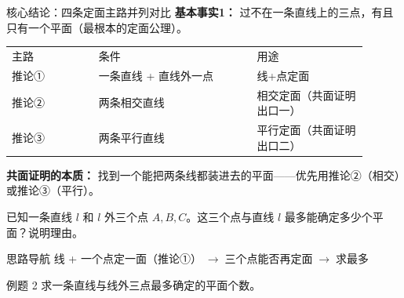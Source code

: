 \documentclass{exam-zh}
\begin{document}
\clearpage
{}


\begin{eduSolutionBox}{核心结论：四条定面主路并列对比}
  \begingroup
  \setlength{\parskip}{2.5mm}
\textbf{基本事实1：} 过不在一条直线上的三点，有且只有一个平面（最根本的定面公理）。\par
\begin{tabular}{p{0.22\linewidth}p{0.40\linewidth}p{0.28\linewidth}}
主路 & 条件 & 用途\\
推论① & 一条直线 + 直线外一点 & 线+点定面\\
推论② & 两条相交直线 & 相交定面（共面证明出口一）\\
推论③ & 两条平行直线 & 平行定面（共面证明出口二）\\
\end{tabular}
\par
\textbf{共面证明的本质：} 找到一个能把两条线都装进去的平面——优先用推论②（相交）或推论③（平行）。\par
  \endgroup
\end{eduSolutionBox}




\begin{eduProblemBlock}[例题 2]
已知一条直线 $l$ 和 $l$ 外三个点 $A,B,C$。这三个点与直线 $l$
最多能确定多少个平面？说明理由。

\end{eduProblemBlock}





\begin{eduAuxItem}{思路导航}
线 + 一个点定一面（推论①）$\;\to\;$三个点能否再定面$\;\to\;$求最多\end{eduAuxItem}




\begin{eduSubQuestionItem}{例题 2}
求一条直线与线外三点最多确定的平面个数。\end{eduSubQuestionItem}
\end{document}

